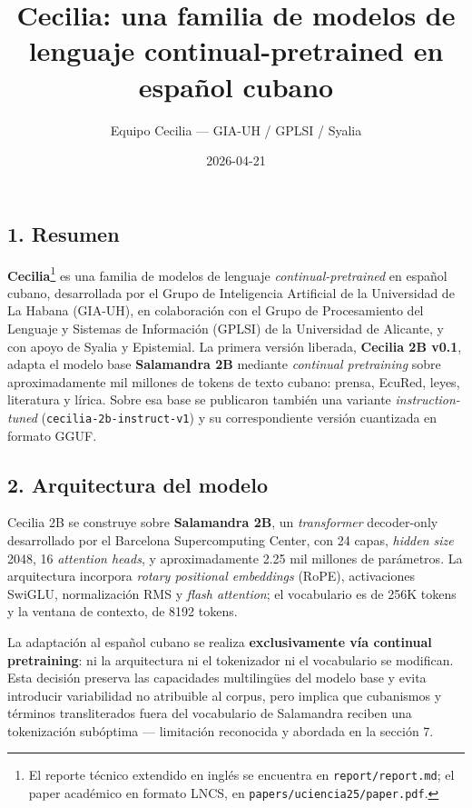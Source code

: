 \documentclass[
  spanish,
  letterpaper,
  DIV=11,
  numbers=noendperiod]{scrartcl}
\title{Cecilia: una familia de modelos de lenguaje continual-pretrained
en español cubano}
\author{Equipo Cecilia --- GIA-UH / GPLSI / Syalia}
\date{2026-04-21}
\begin{document}
\maketitle


\subsection{1. Resumen}\label{resumen}

\textbf{Cecilia}\footnote{El reporte técnico extendido en inglés se
  encuentra en \texttt{report/report.md}; el paper académico en formato
  LNCS, en \texttt{papers/uciencia25/paper.pdf}.} es una familia de
modelos de lenguaje \emph{continual-pretrained} en español cubano,
desarrollada por el Grupo de Inteligencia Artificial de la Universidad
de La Habana (GIA-UH), en colaboración con el Grupo de Procesamiento del
Lenguaje y Sistemas de Información (GPLSI) de la Universidad de
Alicante, y con apoyo de Syalia y Epistemial. La primera versión
liberada, \textbf{Cecilia 2B v0.1}, adapta el modelo base
\textbf{Salamandra 2B} mediante \emph{continual pretraining} sobre
aproximadamente mil millones de tokens de texto cubano: prensa, EcuRed,
leyes, literatura y lírica. Sobre esa base se publicaron también una
variante \emph{instruction-tuned} (\texttt{cecilia-2b-instruct-v1}) y su
correspondiente versión cuantizada en formato GGUF.

\subsection{2. Arquitectura del modelo}\label{arquitectura-del-modelo}

Cecilia 2B se construye sobre \textbf{Salamandra 2B}, un
\emph{transformer} decoder-only desarrollado por el Barcelona
Supercomputing Center, con 24 capas, \emph{hidden size} 2048, 16
\emph{attention heads}, y aproximadamente 2.25 mil millones de
parámetros. La arquitectura incorpora \emph{rotary positional
embeddings} (RoPE), activaciones SwiGLU, normalización RMS y \emph{flash
attention}; el vocabulario es de 256K tokens y la ventana de contexto,
de 8192 tokens.

La adaptación al español cubano se realiza \textbf{exclusivamente vía
continual pretraining}: ni la arquitectura ni el tokenizador ni el
vocabulario se modifican. Esta decisión preserva las capacidades
multilingües del modelo base y evita introducir variabilidad no
atribuible al corpus, pero implica que cubanismos y términos
transliterados fuera del vocabulario de Salamandra reciben una
tokenización subóptima --- limitación reconocida y abordada en la
sección 7.
\end{document}
